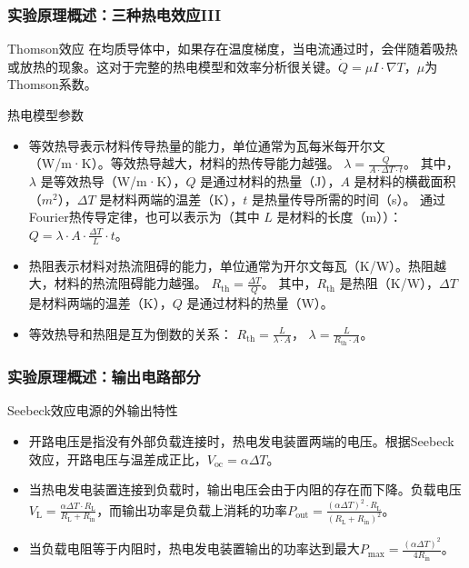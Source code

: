\documentclass[aspectratio=169]{beamer}
\begin{document}
	\begin{frame}
		\frametitle{实验原理概述：三种热电效应III}
		
		\begin{block}{Thomson效应}
			\scriptsize 在均质导体中，如果存在温度梯度，当电流通过时，会伴随着吸热或放热的现象。这对于完整的热电模型和效率分析很关键。$\dot{Q}=\mu I\cdot \nabla T$，$\mu$为Thomson系数。
		\end{block}
		
		\begin{block}{热电模型参数}
			\begin{itemize}
				\scriptsize \item \scriptsize 等效热导表示材料传导热量的能力，单位通常为瓦每米每开尔文（W/m·K）。等效热导越大，材料的热传导能力越强。
				$
				\lambda = \frac{Q}{A \cdot \Delta T \cdot t}
				$。
				\scriptsize 其中，$\lambda$ 是等效热导（W/m·K），$Q$ 是通过材料的热量（J），$A$ 是材料的横截面积（$m^2$），$\Delta T$ 是材料两端的温差（K），$t$ 是热量传导所需的时间（s）。
				\scriptsize 通过Fourier热传导定律，也可以表示为（其中 $L$ 是材料的长度（m））：
				$
				Q = \lambda \cdot A \cdot \frac{\Delta T}{L} \cdot t
				$。
				
				\item \scriptsize 热阻表示材料对热流阻碍的能力，单位通常为开尔文每瓦（K/W）。热阻越大，材料的热流阻碍能力越强。
				$
				R_{\text{th}} = \frac{\Delta T}{Q}
				$。
				\scriptsize 其中，$R_{\text{th}}$ 是热阻（K/W），$\Delta T$ 是材料两端的温差（K），$Q$ 是通过材料的热量（W）。
				
				\item \scriptsize 等效热导和热阻是互为倒数的关系：
				$
				R_{\text{th}} = \frac{L}{\lambda \cdot A}
				$，
				$
				\lambda = \frac{L}{R_{\text{th}} \cdot A}
				$。
			\end{itemize}
		\end{block}
		
	\end{frame}
	
	\begin{frame}
		\frametitle{实验原理概述：输出电路部分}
		
		\begin{block}{Seebeck效应电源的外输出特性}
			\begin{itemize}
				\item 开路电压是指没有外部负载连接时，热电发电装置两端的电压。根据Seebeck效应，开路电压与温差成正比，$V_{\text{oc}} = \alpha \Delta T$。
				
				\item 当热电发电装置连接到负载时，输出电压会由于内阻的存在而下降。负载电压$V_{\text{L}} = \frac{\alpha \Delta T \cdot R_{\text{L}}}{R_{\text{L}} + R_{\text{in}}}$，而输出功率是负载上消耗的功率$P_{\text{out}} = \frac{(\alpha \Delta T)^2 \cdot R_{\text{L}}}{(R_{\text{L}} + R_{\text{in}})^2}$。
				
				\item \textcolor{c4}{当负载电阻等于内阻时}，热电发电装置输出的功率达到最大$P_{\text{max}} = \frac{(\alpha \Delta T)^2}{4 R_{\text{in}}}$。				
			\end{itemize}						
		\end{block}
		
	\end{frame}
	
\end{document}
